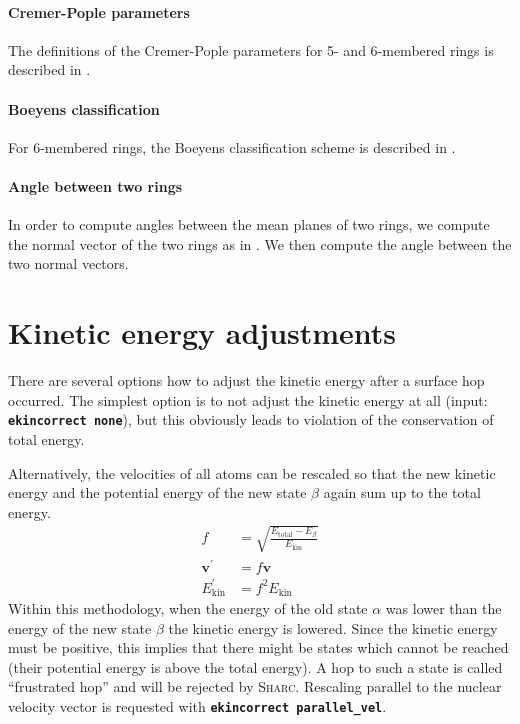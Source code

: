 \documentclass[a4paper,10pt,DIV=15,openany]{scrbook}
\newcommand{\sharc}{\textsc{Sharc}}
\newcommand{\ttt}[1]{\textbf{\texttt{#1}}}
\newcommand{\VEC}[1]{\ensuremath{\mathbf{#1}}}
\begin{document}
\paragraph{Cremer-Pople parameters}

The definitions of the Cremer-Pople parameters for 5- and 6-membered rings is described in \cite{Cremer1975JACS}.

\paragraph{Boeyens classification}

For 6-membered rings, the Boeyens classification scheme is described in \cite{Boeyens1976JCMS}.

\paragraph{Angle between two rings}

In order to compute angles between the mean planes of two rings, we compute the normal vector of the two rings as in \cite{Cremer1975JACS}.
We then compute the angle between the two normal vectors.


\section{Kinetic energy adjustments}\label{met:ekinadj}

There are several options how to adjust the kinetic energy after a surface hop occurred. The simplest option is to not adjust the kinetic energy at all (input: \ttt{ekincorrect none}), but this obviously leads to violation of the conservation of total energy.

Alternatively, the velocities of all atoms can be rescaled so that the new kinetic energy and the potential energy of the new state $\beta$ again sum up to the total energy.
\begin{align}
  f&=\sqrt{\frac{E_{\text{total}}-E_\beta}{E_{\text{kin}}}}\\
  \VEC{v}^\prime&=f\VEC{v}\\
  E_{\text{kin}}^\prime&=f^2E_{\text{kin}}
\end{align}
Within this methodology, when the energy of the old state $\alpha$ was lower than the energy of the new state $\beta$ the kinetic energy is lowered. Since the kinetic energy must be positive, this implies that there might be states which cannot be reached (their potential energy is above the total energy). A hop to such a state is called ``frustrated hop'' and will be rejected by \sharc. Rescaling parallel to the nuclear velocity vector is requested with \ttt{ekincorrect parallel\_vel}.
\end{document}
